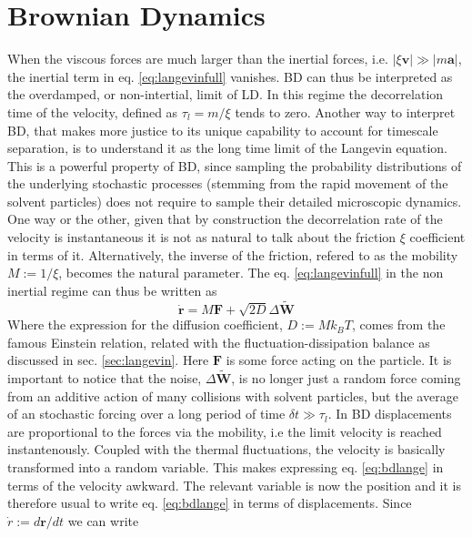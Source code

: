 \documentclass[ twoside,openright,titlepage,numbers=noenddot,%
headinclude,footinclude,cleardoublepage=empty,abstract=on,
BCOR=5mm,paper=a4,fontsize=11pt, dvipsnames
]{scrreprt}
\renewcommand{\vec}[1]{\bm{#1}}
\newcommand{\dt}{\delta t}
\begin{document}
\section{Brownian Dynamics}
When the viscous forces are much larger than the inertial forces, i.e. $ |\xi\vec{v}| \gg |m\vec{a}|$, the inertial term in eq. \eqref{eq:langevinfull} vanishes.
\gls{BD} can thus be interpreted as the overdamped, or non-intertial, limit of \gls{LD}. In this regime the decorrelation time of the velocity, defined as $\tau_l = m/\xi$ tends to zero.
Another way to interpret \gls{BD}, that makes more justice to its unique capability to account for timescale separation, is to understand it as the long time limit of the Langevin equation. This is a powerful property of \gls{BD}, since sampling the probability distributions of the underlying stochastic processes (stemming from the rapid movement of the solvent particles) does not require to sample their detailed microscopic dynamics.
One way or the other, given that by construction the decorrelation rate of the velocity is instantaneous it is not as natural to talk about the friction $\xi$ coefficient in terms of it. Alternatively, the inverse of the friction, refered to as the mobility $M:=1/\xi$, becomes the natural parameter. The eq. \eqref{eq:langevinfull} in the non inertial regime can thus be written as
\begin{equation}
  \label{eq:bdlange}
  \dot{\vec{r}} = M\vec{F} + \sqrt{2D}\Delta\vec{\widetilde{W}}
\end{equation}
Where the expression for the diffusion coefficient, $D := Mk_BT$, comes from the famous Einstein relation\cite{einstein}, related with the fluctuation-dissipation balance as discussed in sec. \ref{sec:langevin}. Here $\vec{F}$ is some force acting on the particle.
It is important to notice that the noise, $\Delta\vec{\widetilde{W}}$, is no longer just a random force coming from an additive action of many collisions with solvent particles, but the average of an stochastic forcing over a long period of time $\dt \gg \tau_l$.
In \gls{BD} displacements are proportional to the forces via the mobility, i.e the limit velocity is reached instantenously.
Coupled with the thermal fluctuations, the velocity is basically transformed into a random variable. This makes expressing eq. \eqref{eq:bdlange} in terms of the velocity awkward. The relevant variable is now the position and it is therefore usual to write eq. \eqref{eq:bdlange} in terms of displacements. Since $\dot{r}:=d\vec{r}/dt$ we can write
\end{document}
